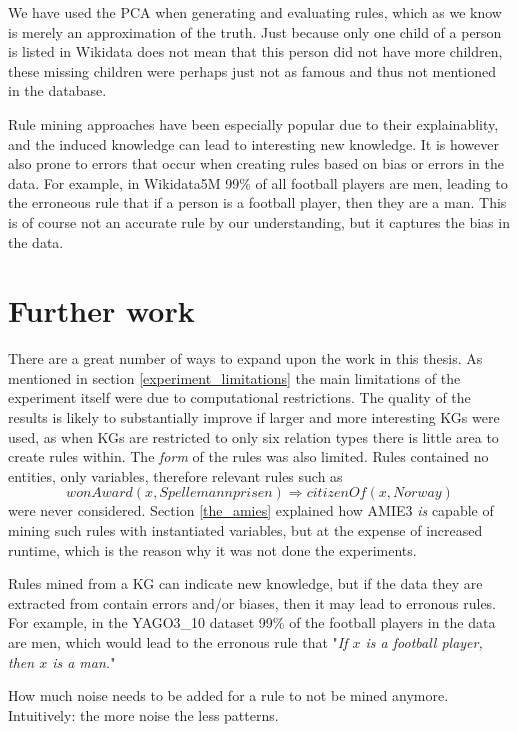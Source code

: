 We have used the PCA when generating and evaluating rules, which as we know is merely an approximation of the truth. Just because only one child of a person is listed in Wikidata does not mean that this person did not have more children, these missing children were perhaps just not as famous and thus not mentioned in the database.

Rule mining approaches have been especially popular due to their explainablity, and the induced knowledge can lead to interesting new knowledge. It is however also prone to errors that occur when creating rules based on bias or errors in the data. For example, in Wikidata5M 99\% of all football players are men, leading to the erroneous rule that if a person is a football player, then they are a man. This is of course not an accurate rule by our understanding, but it captures the bias in the data.

\section{Further work}
There are a great number of ways to expand upon the work in this thesis. As mentioned in section \ref{experiment_limitations} the main limitations of the experiment itself were due to computational restrictions. The quality of the results is likely to substantially improve if larger and more interesting KGs were used, as when KGs are restricted to only six relation types there is little area to create rules within. The \textit{form} of the rules was also limited. Rules contained no entities, only variables, therefore relevant rules such as
\[wonAward(x, Spellemannprisen) \Rightarrow citizenOf(x, Norway)\]
were never considered. Section \ref{the_amies} explained how AMIE3 \textit{is} capable of mining such rules with instantiated variables, but at the expense of increased runtime, which is the reason why it was not done the experiments.

Rules mined from a KG can indicate new knowledge, but if the data they are extracted from contain errors and/or biases, then it may lead to erronous rules. For example, in the YAGO3\_10 dataset 99\% of the football players in the data are men, which would lead to the erronous rule that "\textit{If $x$ is a football player, then $x$ is a man.}"

How much noise needs to be added for a rule to not be mined anymore. Intuitively: the more noise the less patterns.

